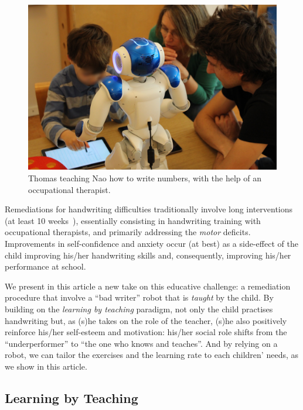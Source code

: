 \documentclass{article}
\begin{document}
\begin{figure}
    \centering
    \includegraphics[width=0.9\linewidth]{henry}
    \caption{\small Thomas teaching Nao how to write numbers, with the help of an
    occupational therapist.}
    \label{fig:henry}
\end{figure}

Remediations for handwriting difficulties traditionally involve long
interventions (at least 10 weeks~\cite{Hoy2011}), essentially consisting in
handwriting training with occupational therapists, and primarily addressing the
\emph{motor} deficits.  Improvements in self-confidence and anxiety occur (at
best) as a side-effect of the child improving his/her handwriting skills and,
consequently, improving his/her performance at school.

We present in this article a new take on this educative challenge: a remediation
procedure that involve a ``bad writer'' robot that is \emph{taught} by the
child. By building on the \emph{learning by teaching} paradigm, not only the
child practises handwriting but, as (s)he takes on the role of the teacher,
(s)he also positively reinforce his/her self-esteem and motivation: his/her
social role shifts from the ``underperformer'' to ``the one who knows and
teaches''. And by relying on a robot, we can tailor the exercises and the
learning rate to each children' needs, as we show in this article.

\subsection{Learning by Teaching}
\end{document}
